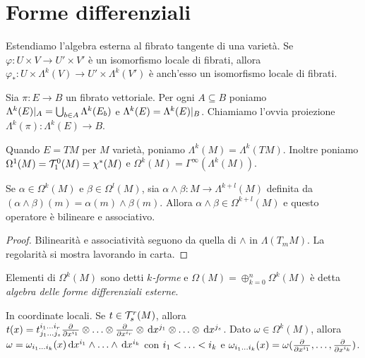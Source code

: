 \section{Forme differenziali}

Estendiamo l'algebra esterna al fibrato tangente di una varietà.
Se $\varphi: U \times V \to U' \times V'$ è un isomorfismo locale di fibrati, allora $\varphi_* : U\times \Lambda^k(V) \to U' \times \Lambda^k(V')$ è anch'esso un isomorfismo locale di fibrati.

\begin{definition}
	Sia $\pi : E\to B$ un fibrato vettoriale. Per ogni $A\subseteq B$ poniamo $\Lambda^k(E)\restrict{A} = \bigcup_{b\in A} \Lambda^k(E_b)$ e $\Lambda^k(E) = \Lambda^k(E) \restrict B$.
	Chiamiamo l'ovvia proiezione $\Lambda^k(\pi) : \Lambda^k(E) \to B$.
\end{definition}

Quando $E = TM$ per $M$ varietà, poniamo $\Lambda^k(M) = \Lambda^k(TM)$. Inoltre poniamo $\Omega^1(M) = \Tau^0_1(M) = \chi^*(M)$ e $\Omega^k(M) = \Gamma^\infty(\Lambda^k(M))$.

\begin{proposition}
	Se $\alpha \in \Omega^k(M)$ e $\beta \in \Omega^l(M)$, sia $\alpha \wedge \beta : M \to \Lambda^{k+l}(M)$ definita da $(\alpha\wedge\beta)(m) = \alpha(m) \wedge \beta(m)$. Allora $\alpha\wedge\beta \in \Omega^{k+l}(M)$ e questo operatore è bilineare e associativo.
\end{proposition}
\begin{proof}
	Bilinearità e associatività seguono da quella di $\wedge$ in $\Lambda(T_mM)$. La regolarità si mostra lavorando in carta.
\end{proof}

\begin{definition}
	Elementi di $\Omega^k(M)$ sono detti \emph{$k$-forme} e $\Omega(M) = \oplus_{k=0}^n \Omega^k(M)$ è detta \emph{algebra delle forme differenziali esterne}.
\end{definition}

\begin{remark}
In coordinate locali. Se $t\in\Tau^r_s(M)$, allora $t(x) = t^{\seqb ir{}}_{\seqb js{}} \DerParz{}{x^{i_1}} \otimes \ldots \otimes \DerParz{}{x^{i_r}} \otimes \de x^{j_1} \otimes \ldots \otimes \de x^{j_s}$.
Dato $\omega \in \Omega^k(M)$, allora $\omega = \omega_{\seqb ik{}}(x) \de x^{i_1} \wedge \ldots \wedge \de x^{i_k}$ con $\seqb ik<$ e $\omega_{\seqb ik{}}(x) = \omega(\DerParz{}{x^{i_1}}, \ldots, \DerParz{}{x^{i_k}})$.
\end{remark}

